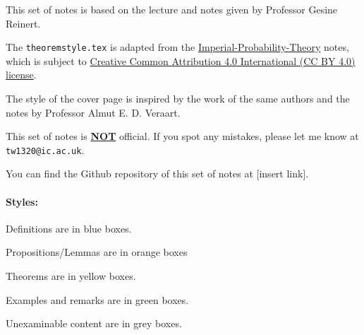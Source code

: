 \thispagestyle{empty}
This set of notes is based on the lecture and notes given by Professor Gesine Reinert.

The \verb|theoremstyle.tex| is adapted from the \href{https://github.com/Samuel-CHLam/Imperial-Probability-Theory}{Imperial-Probability-Theory} notes, which is subject to \href{https://github.com/Samuel-CHLam/Imperial-Probability-Theory#license}{Creative Common Attribution 4.0 International (CC BY 4.0) license}.  

The style of the cover page is inspired by the work of the same authors and the notes by Professor Almut E. D. Veraart.


This set of notes is \underline{\bf NOT} official. If you spot any mistakes, please let me know at \verb|tw1320@ic.ac.uk|.

You can find the Github repository of this set of notes at [insert link].

\paragraph{Styles:}
\mbox{}
\begin{definition}
    Definitions are in blue boxes.
\end{definition}

\begin{proposition}
    Propositions/Lemmas are in orange boxes
\end{proposition}
\begin{theorem}
    Theorems are in yellow boxes.
\end{theorem}

\begin{example}
    Examples and remarks are in green boxes. 
\end{example}

\begin{unexaminable}
    Unexaminable content are in grey boxes.
\end{unexaminable}  
 


